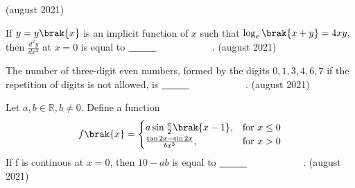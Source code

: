 \hfill{(august 2021)}  
\item If $y=y\brak{x}$ is an implicit function of $x$ such that $\log_{e}\brak{x+y}=4xy,$ then $\frac{d^2y}{dx^2}$ at $x=0$ is equal to $\makebox[3cm][l]{\underline{\hspace{1cm}}}$.
\hfill{(august 2021)}  
\item The number of three-digit even numbers, formed by the digits $0, 1, 3, 4, 6, 7$ if the repetition of digits is not allowed, is $\makebox[3cm][l]{\underline{\hspace{1cm}}}$.
\hfill{(august 2021)}  
\item Let $a,b \in \mathbb{R}, b\neq 0$. Define a function 
       \[
       f\brak{x}=
       \begin{cases}
           a\sin\frac{\pi}{2}\brak{x-1},&\text{for }x\leq 0\\
           \frac{\tan 2x -\sin 2x}{bx^{3}},&\text{for }x>0
       \end{cases}
       \]
       If f is continous at $x=0$, then $10-ab$ is equal to  $\makebox[3cm][l]{\underline{\hspace{1cm}}}$.
			 \hfill{(august 2021)}  

